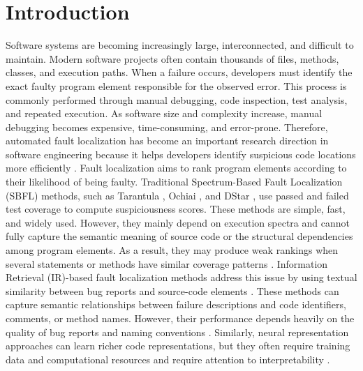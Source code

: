 \documentclass[article,article,submit,pdftex,moreauthors]{Definitions/mdpi}
\begin{document}
\section{Introduction}
\label{sec:introduction}

Software systems are becoming increasingly large, interconnected, and difficult to maintain. Modern software projects often contain thousands of files, methods, classes, and execution paths. When a failure occurs, developers must identify the exact faulty program element responsible for the observed error. This process is commonly performed through manual debugging, code inspection, test analysis, and repeated execution. As software size and complexity increase, manual debugging becomes expensive, time-consuming, and error-prone. Therefore, automated fault localization has become an important research direction in software engineering because it helps developers identify suspicious code locations more efficiently \cite{wong2016survey,sarhan2022survey,wong2023overview,kochhar2016practitioners}. Fault localization aims to rank program elements according to their likelihood of being faulty. Traditional Spectrum-Based Fault Localization (SBFL) methods, such as Tarantula \cite{jones2005tarantula}, Ochiai \cite{abreu2007ochiai}, and DStar \cite{wong2014dstar}, use passed and failed test coverage to compute suspiciousness scores. These methods are simple, fast, and widely used. However, they mainly depend on execution spectra and cannot fully capture the semantic meaning of source code or the structural dependencies among program elements. As a result, they may produce weak rankings when several statements or methods have similar coverage patterns \cite{pearson2017evaluation,zhang2021pagerank,beszedes2022frequency}. Information Retrieval (IR)-based fault localization methods address this issue by using textual similarity between bug reports and source-code elements \cite{zhou2012buglocator,saha2013bluir,le2015better}. These methods can capture semantic relationships between failure descriptions and code identifiers, comments, or method names. However, their performance depends heavily on the quality of bug reports and naming conventions \cite{mills2020queries,kim2021trustworthy,chaparro2019query}. Similarly, neural representation approaches can learn richer code representations, but they often require training data and computational resources and require attention to interpretability \cite{li2019deepfl,lou2021grace,widyasari2022xai4fl}.
\end{document}

